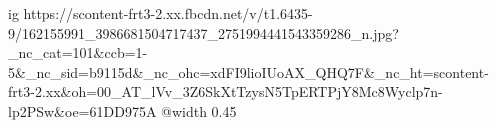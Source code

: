  
 
 
 
 

\ifcmt
  ig https://scontent-frt3-2.xx.fbcdn.net/v/t1.6435-9/162155991_3986681504717437_2751994441543359286_n.jpg?_nc_cat=101&ccb=1-5&_nc_sid=b9115d&_nc_ohc=xdFI9lioIUoAX_QHQ7F&_nc_ht=scontent-frt3-2.xx&oh=00_AT_lVv_3Z6SkXtTzysN5TpERTPjY8Mc8Wyclp7n-lp2PSw&oe=61DD975A
  @width 0.45
\fi
